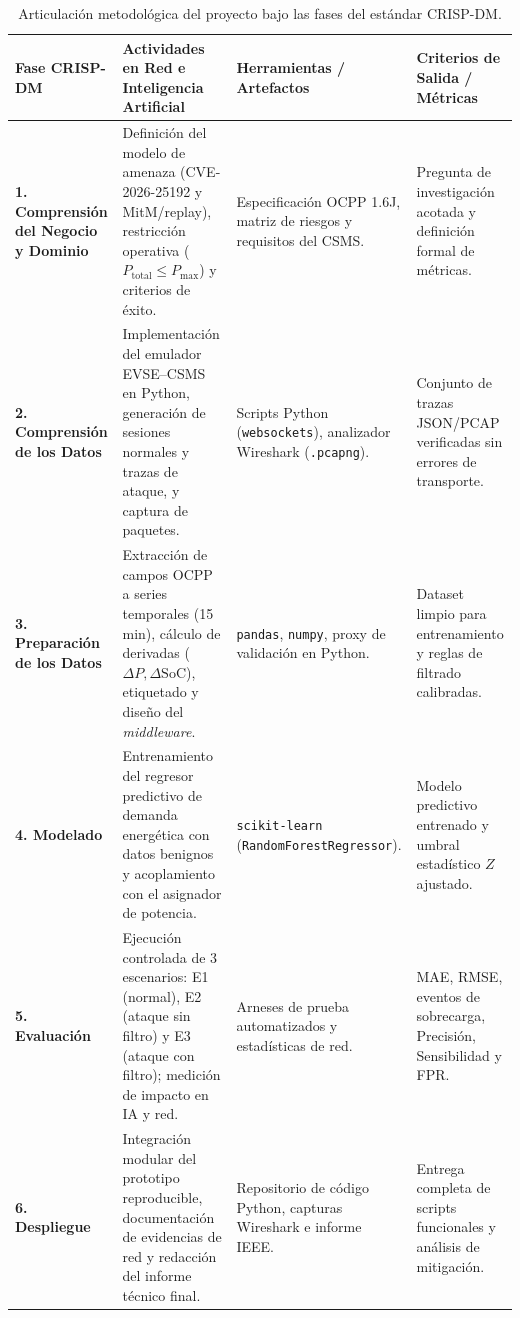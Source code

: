 \documentclass[conference]{IEEEtran}
\begin{document}
\begin{table}[t]
\centering
\caption{Articulación metodológica del proyecto bajo las fases del estándar CRISP-DM.}
\label{tab:crispdm}
\footnotesize
\setlength{\tabcolsep}{4pt}
\begin{tabularx}{\textwidth}{>{\raggedright\arraybackslash\hspace{0pt}}p{2.7cm} >{\raggedright\arraybackslash\hspace{0pt}}X >{\raggedright\arraybackslash\hspace{0pt}}p{3.6cm} >{\raggedright\arraybackslash\hspace{0pt}}p{3.9cm}}
\toprule
\textbf{Fase CRISP-DM} & \textbf{Actividades en Red e Inteligencia Artificial} & \textbf{Herramientas / Artefactos} & \textbf{Criterios de Salida / Métricas} \\
\midrule
\textbf{1. Comprensión del Negocio y Dominio} & Definición del modelo de amenaza (CVE-2026-25192 y MitM/replay), restricción operativa ($P_{\text{total}} \le P_{\max}$) y criterios de éxito. & Especificación OCPP 1.6J, matriz de riesgos y requisitos del CSMS. & Pregunta de investigación acotada y definición formal de métricas. \\
\addlinespace
\textbf{2. Comprensión de los Datos} & Implementación del emulador EVSE--CSMS en Python, generación de sesiones normales y trazas de ataque, y captura de paquetes. & Scripts Python (\texttt{websockets}), analizador Wireshark (\texttt{.pcapng}). & Conjunto de trazas JSON/PCAP verificadas sin errores de transporte. \\
\addlinespace
\textbf{3. Preparación de los Datos} & Extracción de campos OCPP a series temporales (15 min), cálculo de derivadas ($\Delta P, \Delta \text{SoC}$), etiquetado y diseño del \textit{middleware}. & \texttt{pandas}, \texttt{numpy}, proxy de validación en Python. & Dataset limpio para entrenamiento y reglas de filtrado calibradas. \\
\addlinespace
\textbf{4. Modelado} & Entrenamiento del regresor predictivo de demanda energética con datos benignos y acoplamiento con el asignador de potencia. & \texttt{scikit-learn} (\texttt{RandomForestRegressor}). & Modelo predictivo entrenado y umbral estadístico $Z$ ajustado. \\
\addlinespace
\textbf{5. Evaluación} & Ejecución controlada de 3 escenarios: E1 (normal), E2 (ataque sin filtro) y E3 (ataque con filtro); medición de impacto en IA y red. & Arneses de prueba automatizados y estadísticas de red. & MAE, RMSE, eventos de sobrecarga, Precisión, Sensibilidad y FPR. \\
\addlinespace
\textbf{6. Despliegue} & Integración modular del prototipo reproducible, documentación de evidencias de red y redacción del informe técnico final. & Repositorio de código Python, capturas Wireshark e informe IEEE. & Entrega completa de scripts funcionales y análisis de mitigación. \\
\bottomrule
\end{tabularx}
\end{table}
\FloatBarrier
\end{document}
